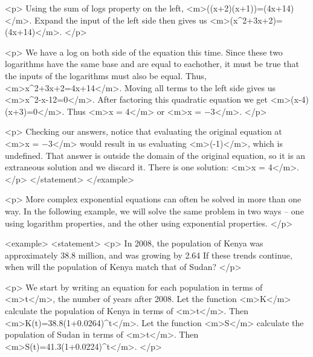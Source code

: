                <p>
                    Using the sum of logs property on the left, <m>\ln((x+2)(x+1))=\ln(4x+14)</m>.
                    Expand the input of the left side then gives us <m>\ln(x^{2}+3x+2)=\ln(4x+14)</m>.
                </p>

                <p>
                    We have a log on both side of the equation this time.
                    Since these two logarithms have the same base and are equal to eachother, it must be true that the inputs of the logarithms must also be equal.
                    Thus, <m>x^{2}+3x+2=4x+14</m>.
                    Moving all terms to the left side gives us <m>x^{2}-x-12=0</m>.
                    After factoring this quadratic equation we get <m>(x-4)(x+3)=0</m>.
                    Thus <m>x = 4</m> or <m>x = −3</m>.
                </p>

                <p>
                    Checking our answers, notice that evaluating the original equation at <m>x = −3</m> would result in us evaluating <m>\ln(-1)</m>, which is undefined.
                    That answer is outside the domain of the original equation, so it is an extraneous solution and we discard it.
                    There is one solution: <m>x = 4</m>.
                </p>
            </statement>
        </example>

        <p>
            More complex exponential equations can often be solved in more than one way.
            In the following example, we will solve the same problem in two ways – one using logarithm properties, and the other using exponential properties.
        </p>

        <example>
            <statement>
                <p>
                    In 2008, the population of Kenya was approximately 38.8 million, and was growing by 2.64%
                    If these trends continue, when will the population of Kenya match that of Sudan?
                </p>

                <p>
                    We start by writing an equation for each population in terms of <m>t</m>, the number of years after 2008.
                    Let the function <m>K</m> calculate the population of Kenya in terms of <m>t</m>.
                    Then <m>K(t)=38.8(1+0.0264)^{t}</m>.
                    Let the function <m>S</m> calculate the population of Sudan in terms of <m>t</m>.
                    Then <m>S(t)=41.3(1+0.0224)^{t}</m>.
                </p>

